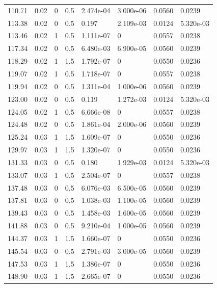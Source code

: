 \documentclass[preview]{standalone}
\begin{document}
{{{\begin{tabular}{L{1.2cm}C{1.2cm} C{0.3cm}C{0.5cm} C{1.4cm}C{1.4cm} C{1.4cm}C{1.4cm}}
  110.71  &  0.02  & 0     & 0.5 &  2.474e-04  & 3.000e-06  & 0.0560 &  0.0239   \\ 
  113.38  &  0.02  & 0     & 0.5 &  0.197  & 2.109e-03  & 0.0124 &  5.320e-03   \\ 
  113.46  &  0.02  & 1     & 0.5 &  1.111e-07  & 0  & 0.0557 &  0.0238   \\ 
  117.34  &  0.02  & 0     & 0.5 &  6.480e-03  & 6.900e-05  & 0.0560 &  0.0239   \\ 
  118.29  &  0.02  & 1     & 1.5 &  1.792e-07  & 0  & 0.0550 &  0.0236   \\ 
  119.07  &  0.02  & 1     & 0.5 &  1.718e-07  & 0  & 0.0557 &  0.0238   \\ 
  119.94  &  0.02  & 0     & 0.5 &  1.311e-04  & 1.000e-06  & 0.0560 &  0.0239   \\ 
  123.00  &  0.02  & 0     & 0.5 &  0.119  & 1.272e-03  & 0.0124 &  5.320e-03   \\ 
  124.05  &  0.02  & 1     & 0.5 &  6.666e-08  & 0  & 0.0557 &  0.0238   \\ 
  124.48  &  0.02  & 0     & 0.5 &  1.861e-04  & 2.000e-06  & 0.0560 &  0.0239   \\ 
  125.24  &  0.03  & 1     & 1.5 &  1.609e-07  & 0  & 0.0550 &  0.0236   \\ 
  129.97  &  0.03  & 1     & 1.5 &  1.320e-07  & 0  & 0.0550 &  0.0236   \\ 
  131.33  &  0.03  & 0     & 0.5 &  0.180  & 1.929e-03  & 0.0124 &  5.320e-03   \\ 
  133.07  &  0.03  & 1     & 0.5 &  2.504e-07  & 0  & 0.0557 &  0.0238   \\ 
  137.48  &  0.03  & 0     & 0.5 &  6.076e-03  & 6.500e-05  & 0.0560 &  0.0239   \\ 
  137.81  &  0.03  & 0     & 0.5 &  1.038e-03  & 1.100e-05  & 0.0560 &  0.0239   \\ 
  139.43  &  0.03  & 0     & 0.5 &  1.458e-03  & 1.600e-05  & 0.0560 &  0.0239   \\ 
  141.88  &  0.03  & 0     & 0.5 &  9.210e-04  & 1.000e-05  & 0.0560 &  0.0239   \\ 
  144.37  &  0.03  & 1     & 1.5 &  1.660e-07  & 0  & 0.0550 &  0.0236   \\ 
  145.54  &  0.03  & 0     & 0.5 &  2.791e-03  & 3.000e-05  & 0.0560 &  0.0239   \\ 
  147.53  &  0.03  & 1     & 1.5 &  1.386e-07  & 0  & 0.0550 &  0.0236   \\ 
  148.90  &  0.03  & 1     & 1.5 &  2.665e-07  & 0  & 0.0550 &  0.0236   \\ 

\end{tabular}}}}
\end{document}
